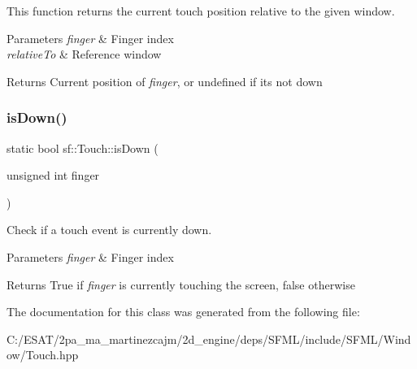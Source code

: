 This function returns the current touch position relative to the given window.


\begin{DoxyParams}{Parameters}
{\em finger} & Finger index \\
\hline
{\em relative\+To} & Reference window\\
\hline
\end{DoxyParams}
\begin{DoxyReturn}{Returns}
Current position of {\itshape finger}, or undefined if it\textquotesingle{}s not down 
\end{DoxyReturn}
\mbox{\label{classsf_1_1_touch_a2f85297123ea4e401d02c346e50d48a3}} 
\subsubsection{\texorpdfstring{is\+Down()}{isDown()}}
{\footnotesize\ttfamily static bool sf\+::\+Touch\+::is\+Down (\begin{DoxyParamCaption}\item[{unsigned int}]{finger }\end{DoxyParamCaption})\hspace{0.3cm}{\ttfamily [static]}}



Check if a touch event is currently down. 


\begin{DoxyParams}{Parameters}
{\em finger} & Finger index\\
\hline
\end{DoxyParams}
\begin{DoxyReturn}{Returns}
True if {\itshape finger} is currently touching the screen, false otherwise 
\end{DoxyReturn}


The documentation for this class was generated from the following file\+:\begin{DoxyCompactItemize}
\item 
C\+:/\+E\+S\+A\+T/2pa\+\_\+ma\+\_\+martinezcajm/2d\+\_\+engine/deps/\+S\+F\+M\+L/include/\+S\+F\+M\+L/\+Window/Touch.\+hpp\end{DoxyCompactItemize}
